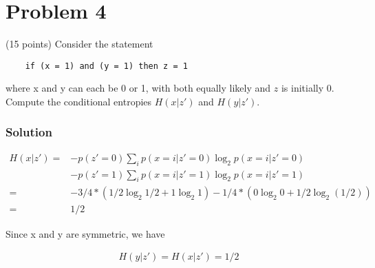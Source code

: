 \section*{Problem 4}
(15 points) Consider the statement

\begin{lstlisting}
    if (x = 1) and (y = 1) then z = 1 
\end{lstlisting}

where x and y can each be 0 or 1, with both equally likely and $z$ is initially 0. 
Compute the conditional entropies $H(x | z')$ and $H(y | z')$.

\subsubsection*{Solution}

\begin{align*}
    H(x | z')  = & -p(z'=0) \sum_i p(x=i | z'=0)\log_2 p(x=i | z'=0) \\ 
       & -p(z'=1) \sum_i p(x=i | z'=1)\log_2 p(x=i | z'=1)  \\
     = & -3/4 * (1/2\log_2 1/2 + 1\log_2 1) - 1/4 * (0\log_2 0 + 1/2\log_2(1/2))\\
     = & 1/2
\end{align*}

Since x and y are symmetric, we have 

\begin{align*}
    H(y | z') = H(x | z') = 1/2
\end{align*}